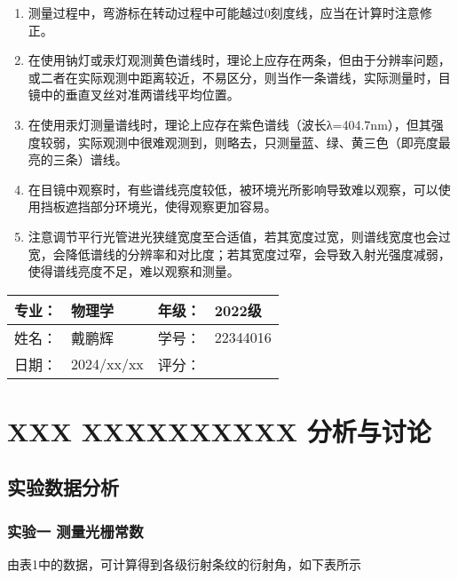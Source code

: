 \documentclass[dvipsnames, svgnames,a4paper,11pt]{article}
\begin{document}
\begin{enumerate}
	\item 	测量过程中，弯游标在转动过程中可能越过0刻度线，应当在计算时注意修正。
	
	\item 	在使用钠灯或汞灯观测黄色谱线时，理论上应存在两条，但由于分辨率问题，或二者在实际观测中距离较近，不易区分，则当作一条谱线，实际测量时，目镜中的垂直叉丝对准两谱线平均位置。
	
	\item 	在使用汞灯测量谱线时，理论上应存在紫色谱线（波长λ=404.7nm），但其强度较弱，实际观测中很难观测到，则略去，只测量蓝、绿、黄三色（即亮度最亮的三条）谱线。
	
	\item 	在目镜中观察时，有些谱线亮度较低，被环境光所影响导致难以观察，可以使用挡板遮挡部分环境光，使得观察更加容易。
	
	\item 	注意调节平行光管进光狭缝宽度至合适值，若其宽度过宽，则谱线宽度也会过宽，会降低谱线的分辨率和对比度；若其宽度过窄，会导致入射光强度减弱，使得谱线亮度不足，难以观察和测量。
	
\end{enumerate}
	

\clearpage
\begin{table}
	\renewcommand\arraystretch{1.7}
	\begin{tabularx}{\textwidth}{|X|X|X|X|}
	\hline
	专业：& 物理学 &年级：& 2022级\\
	\hline
	姓名： & 戴鹏辉 & 学号：& 22344016\\
	\hline
    日期：& 2024/xx/xx & 评分： &\\
	\hline
	\end{tabularx}
\end{table}

\section{XXX \quad XXXXXXXXXX \quad\heiti 分析与讨论}

\subsection{实验数据分析}

	\subsubsection{实验一 测量光栅常数}
		由表1中的数据，可计算得到各级衍射条纹的衍射角，如下表所示
		
\end{document}
